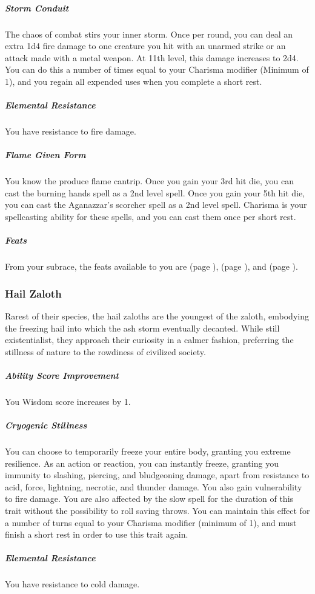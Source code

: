     \subparagraph{Storm Conduit} The chaos of combat stirs your inner storm.
    Once per round, you can deal an extra 1d4 fire damage to one creature you hit with an unarmed strike or an attack made with a metal weapon.
    At 11th level, this damage increases to 2d4.
    You can do this a number of times equal to your Charisma modifier (Minimum of 1), and you regain all expended uses when you complete a short rest.

    \subparagraph{Elemental Resistance} You have resistance to fire damage.

    \subparagraph{Flame Given Form} You know the produce flame cantrip.
    Once you gain your 3rd hit die, you can cast the burning hands spell as a 2nd level spell.
    Once you gain your 5th hit die, you can cast the Aganazzar's scorcher spell as a 2nd level spell.
    Charisma is your spellcasting ability for these spells, and you can cast them once per short rest.

    \subparagraph{Feats} From your subrace, the feats available to you are
    \textbf{} (page \pageref{feat::}),
    \textbf{} (page \pageref{feat::}), and
    \textbf{} (page \pageref{feat::}).

\subsubsection{Hail Zaloth}
    Rarest of their species, the hail zaloths are the youngest of the zaloth, embodying the freezing hail into which the ash storm eventually decanted.
    While still existentialist, they approach their curiosity in a calmer fashion, preferring the stillness of nature to the rowdiness of civilized society.

    \subparagraph{Ability Score Improvement} You Wisdom score increases by 1.

    \subparagraph{Cryogenic Stillness} You can choose to temporarily freeze your entire body, granting you extreme resilience.
    As an action or reaction, you can instantly freeze, granting you immunity to slashing, piercing, and bludgeoning damage, apart from resistance to acid, force, lightning, necrotic, and thunder damage.
    You also gain vulnerability to fire damage.
    You are also affected by the slow spell for the duration of this trait without the possibility to roll saving throws.
    You can maintain this effect for a number of turns equal to your Charisma modifier (minimum of 1), and must finish a short rest in order to use this trait again.

    \subparagraph{Elemental Resistance} You have resistance to cold damage.

